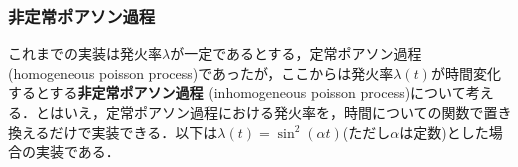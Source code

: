 \subsubsection{非定常ポアソン過程}
これまでの実装は発火率$\lambda$が一定であるとする，定常ポアソン過程 (homogeneous poisson process)であったが，ここからは発火率$\lambda(t)$が時間変化するとする\textbf{非定常ポアソン過程} (inhomogeneous poisson process)について考える．とはいえ，定常ポアソン過程における発火率を，時間についての関数で置き換えるだけで実装できる．以下は$\lambda(t)=\sin^2(\alpha t)$(ただし$\alpha$は定数)とした場合の実装である．
